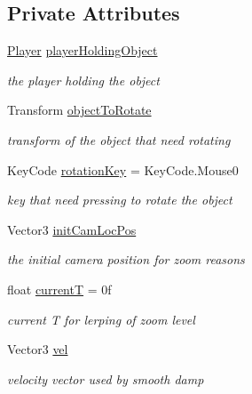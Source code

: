 \subsection*{Private Attributes}
\begin{DoxyCompactItemize}
\item 
\mbox{\hyperlink{class_player}{Player}} \mbox{\hyperlink{class_object_in_hand_component_add0e2bed573b54275914fc48c37b958c}{player\+Holding\+Object}}
\begin{DoxyCompactList}\small\item\em the player holding the object \end{DoxyCompactList}\item 
Transform \mbox{\hyperlink{class_object_in_hand_component_adbeb015fd1ac714798d886db0b6f940a}{object\+To\+Rotate}}
\begin{DoxyCompactList}\small\item\em transform of the object that need rotating \end{DoxyCompactList}\item 
Key\+Code \mbox{\hyperlink{class_object_in_hand_component_aa84650b4fd81b0c4aa0bc91d2a371625}{rotation\+Key}} = Key\+Code.\+Mouse0
\begin{DoxyCompactList}\small\item\em key that need pressing to rotate the object \end{DoxyCompactList}\item 
Vector3 \mbox{\hyperlink{class_object_in_hand_component_a002cb792e31eb3f99e15c126a07fa67b}{init\+Cam\+Loc\+Pos}}
\begin{DoxyCompactList}\small\item\em the initial camera position for zoom reasons \end{DoxyCompactList}\item 
float \mbox{\hyperlink{class_object_in_hand_component_a173143fff5ee217d1148281e49f26e10}{currentT}} = 0f
\begin{DoxyCompactList}\small\item\em current T for lerping of zoom level \end{DoxyCompactList}\item 
Vector3 \mbox{\hyperlink{class_object_in_hand_component_abbcf3780d099790d8d2e799ab4447ec6}{vel}}
\begin{DoxyCompactList}\small\item\em velocity vector used by smooth damp \end{DoxyCompactList}\end{DoxyCompactItemize}


